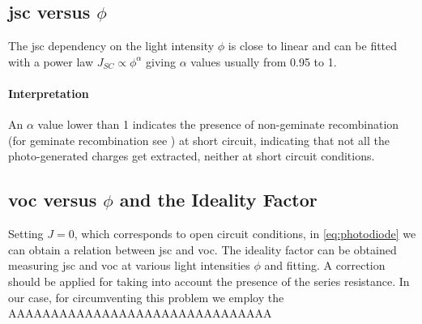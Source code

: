 \subsection{\Gls{jsc} versus $\phi$}
The \gls{jsc} dependency on the light intensity $\phi$ is close to linear and can be fitted with a power law $J_{SC} \propto \phi^\alpha$ giving $\alpha$ values usually from 0.95 to 1.

\paragraph{Interpretation} %
An $\alpha$ value lower than 1 indicates the presence of non-geminate recombination (for geminate recombination see ) at short circuit\cite{Credgington2011}, indicating that not all the photo-generated charges get extracted, neither at short circuit conditions.

\subsection{\Gls{voc} versus $\phi$ and the Ideality Factor}

Setting $J=0$, which corresponds to open circuit conditions, in \cref{eq:photodiode} we can obtain a relation between \gls{jsc} and \gls{voc}. The ideality factor can be obtained measuring \gls{jsc} and \gls{voc} at various light intensities $\phi$ and fitting. A correction should be applied for taking into account the presence of the series resistance. In our case, for circumventing this problem we employ the AAAAAAAAAAAAAAAAAAAAAAAAAAAAAAA

